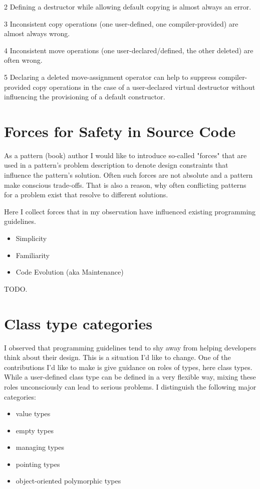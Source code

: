 \documentclass[ebook,11pt,article]{memoir}
\begin{document}
\begin{table}[htp]
\begin{center}
\begin{threeparttable}
\begin{tablenotes}
\item[2] Defining a destructor while allowing default copying is almost always an error.
\item[3] Inconsistent copy operations (one user-defined, one compiler-provided) are almost always wrong.
\item[4] Inconsistent move operations (one user-declared/defined, the other deleted) are often wrong.
\item[5] Declaring a deleted move-assignment operator can help to suppress compiler-provided copy operations in the case of a user-declared virtual destructor without influencing the provisioning of a default constructor.
\end{tablenotes}
\end{threeparttable}
\end{center}
\label{default}
\end{table}%


\chapter{Forces for Safety in Source Code}
As a pattern (book) author I would like to introduce so-called "forces" that are used in a pattern's problem description to denote design constraints that influence the pattern's solution. Often such forces are not absolute and a pattern make conscious trade-offs. That is also a reason, why often conflicting patterns for a problem exist that resolve to different solutions.

Here I collect forces that in my observation have influenced existing programming guidelines.
\begin{itemize}
\item Simplicity
\item Familiarity
\item Code Evolution (aka Maintenance)
\end{itemize}

TODO.


\chapter{Class type categories}
I observed that programming guidelines tend to shy away from helping developers think about their design.
This is a situation I'd like to change. One of the contributions I'd like to make is give guidance on roles of types, here class types. While a user-defined class type can be defined in a very flexible way, mixing these roles unconsciously can lead to serious problems. 
I distinguish the following major categories:
\begin{itemize}
\item value types
\item empty types
\item managing types
\item pointing types
\item object-oriented polymorphic types
\end{itemize}
\end{document}
